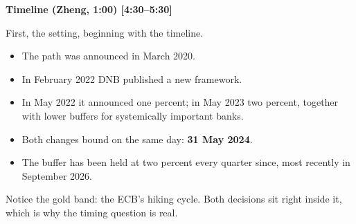 {\small\textbf{Timeline (Zheng, 1:00) [4:30–5:30]}}\par\smallskip
First, the setting, beginning with the timeline.
\begin{itemize}\setlength\itemsep{0pt}
\item The path was announced in March 2020.
\item In February 2022 DNB published a new framework.
\item In May 2022 it announced one percent; in May 2023 two percent, together with lower buffers for systemically important banks.
\item Both changes bound on the same day: \textbf{31 May 2024}.
\item The buffer has been held at two percent every quarter since, most recently in September 2026.
\end{itemize}
\par\smallskip
Notice the gold band: the ECB's hiking cycle. Both decisions sit right inside it, which is why the timing question is real.
